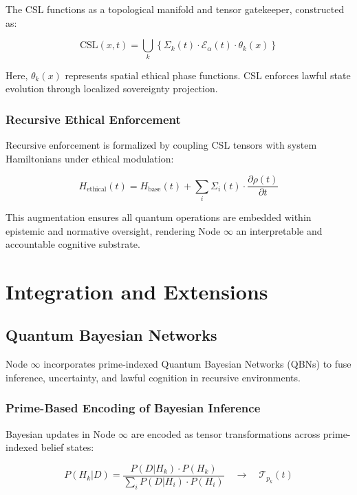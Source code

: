 \documentclass[12pt]{article}
\begin{document}
The CSL functions as a topological manifold and tensor gatekeeper, constructed as:

\begin{equation}
\text{CSL}(x, t) = \bigcup_{k} \left\{ \Sigma_k(t) \cdot \mathcal{E}_\alpha(t) \cdot \theta_k(x) \right\}
\end{equation}

Here, $\theta_k(x)$ represents spatial ethical phase functions. CSL enforces lawful state evolution through localized sovereignty projection.

\subsubsection*{Recursive Ethical Enforcement}

Recursive enforcement is formalized by coupling CSL tensors with system Hamiltonians under ethical modulation:

\begin{equation}
H_{\text{ethical}}(t) = H_{\text{base}}(t) + \sum_{i} \Sigma_i(t) \cdot \frac{\partial \rho(t)}{\partial t}
\end{equation}

This augmentation ensures all quantum operations are embedded within epistemic and normative oversight, rendering Node \( \infty \) an interpretable and accountable cognitive substrate.

\section{Integration and Extensions}

\subsection{Quantum Bayesian Networks}

Node \( \infty \) incorporates prime-indexed Quantum Bayesian Networks (QBNs) to fuse inference, uncertainty, and lawful cognition in recursive environments.

\subsubsection*{Prime-Based Encoding of Bayesian Inference}

Bayesian updates in Node \( \infty \) are encoded as tensor transformations across prime-indexed belief states:

\begin{equation}
P(H_k | D) = \frac{P(D | H_k) \cdot P(H_k)}{\sum_{i} P(D | H_i) \cdot P(H_i)} \quad \longrightarrow \quad \mathcal{T}_{p_k}(t)
\end{equation}
\end{document}
